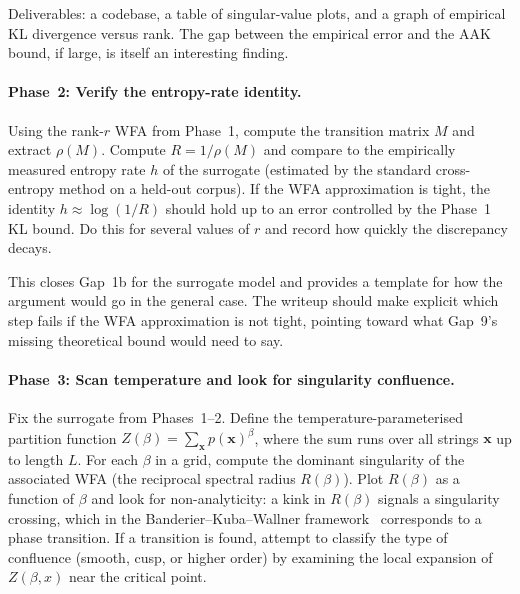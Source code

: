Deliverables: a codebase, a table of singular-value plots, and a
graph of empirical KL divergence versus rank.  The gap between the
empirical error and the AAK bound, if large, is itself an interesting
finding.

\paragraph{Phase~2: Verify the entropy-rate identity.}
\label{ch19:phase2}

Using the rank-$r$ WFA from Phase~1, compute the transition matrix $M$
and extract $\rho(M)$.  Compute $R = 1/\rho(M)$ and compare to the
empirically measured entropy rate $h$ of the surrogate (estimated by
the standard cross-entropy method on a held-out corpus).  If the
WFA approximation is tight, the identity $h \approx \log(1/R)$ should
hold up to an error controlled by the Phase~1 KL bound.  Do this
for several values of $r$ and record how quickly the discrepancy
decays.

This closes Gap~1b for the surrogate model and provides a template for
how the argument would go in the general case.  The writeup should make
explicit which step fails if the WFA approximation is not tight,
pointing toward what Gap~9's missing theoretical bound would need to
say.

\paragraph{Phase~3: Scan temperature and look for singularity
confluence.}
\label{ch19:phase3}

Fix the surrogate from Phases~1--2.  Define the temperature-parameterised
partition function $Z(\beta) = \sum_{\mathbf{x}} p(\mathbf{x})^\beta$,
where the sum runs over all strings $\mathbf{x}$ up to length $L$.
For each $\beta$ in a grid, compute the dominant singularity of the
associated WFA (the reciprocal spectral radius $R(\beta)$).  Plot
$R(\beta)$ as a function of $\beta$ and look for non-analyticity:
a kink in $R(\beta)$ signals a singularity crossing, which in the
Banderier--Kuba--Wallner framework~\cite{BanderierKubaWallner2021}
corresponds to a phase transition.  If a transition is found, attempt to
classify the type of confluence (smooth, cusp, or higher order) by
examining the local expansion of $Z(\beta, x)$ near the critical
point.


